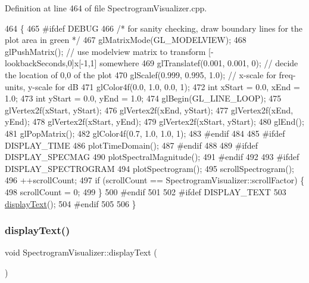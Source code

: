 Definition at line 464 of file Spectrogram\+Visualizer.\+cpp.


\begin{DoxyCode}
464                                     \{
465 \textcolor{preprocessor}{#ifdef DEBUG}
466     \textcolor{comment}{/* for sanity checking, draw boundary lines for the plot area in green */}
467     glMatrixMode(GL\_MODELVIEW);
468     glPushMatrix(); \textcolor{comment}{// use modelview matrix to transform [-lookbackSeconds,0]x[-1,1] somewhere}
469     glTranslatef(0.001, 0.001, 0);   \textcolor{comment}{// decide the location of 0,0 of the plot}
470     glScalef(0.999, 0.995, 1.0);  \textcolor{comment}{// x-scale for freq-units, y-scale for dB}
471     glColor4f(0.0, 1.0, 0.0, 1);
472     \textcolor{keywordtype}{int} xStart = 0.0, xEnd = 1.0;
473     \textcolor{keywordtype}{int} yStart = 0.0, yEnd = 1.0;
474     glBegin(GL\_LINE\_LOOP);
475         glVertex2f(xStart, yStart);
476         glVertex2f(xEnd, yStart);
477         glVertex2f(xEnd, yEnd);
478         glVertex2f(xStart, yEnd);
479         glVertex2f(xStart, yStart);
480     glEnd();
481     glPopMatrix();
482     glColor4f(0.7, 1.0, 1.0, 1);
483 \textcolor{preprocessor}{#endif}
484 
485 \textcolor{preprocessor}{#ifdef DISPLAY\_TIME}
486     plotTimeDomain();
487 \textcolor{preprocessor}{#endif}
488 
489 \textcolor{preprocessor}{#ifdef DISPLAY\_SPECMAG}
490     plotSpectralMagnitude();
491 \textcolor{preprocessor}{#endif}
492 
493 \textcolor{preprocessor}{#ifdef DISPLAY\_SPECTROGRAM}
494     plotSpectrogram();
495     scrollSpectrogram();
496     ++scrollCount;
497     \textcolor{keywordflow}{if} (scrollCount == SpectrogramVisualizer::scrollFactor) \{
498         scrollCount = 0;
499     \}
500 \textcolor{preprocessor}{#endif}
501 
502 \textcolor{preprocessor}{#ifdef DISPLAY\_TEXT}
503     \mbox{\hyperlink{structSpectrogramVisualizer_a9b9aa780d95f710b1c876ce49abac9a1}{displayText}}();
504 \textcolor{preprocessor}{#endif}
505 
506 \}
\end{DoxyCode}
\mbox{\label{structSpectrogramVisualizer_a9b9aa780d95f710b1c876ce49abac9a1}} 
\subsubsection{\texorpdfstring{display\+Text()}{displayText()}}
{\footnotesize\ttfamily void Spectrogram\+Visualizer\+::display\+Text (\begin{DoxyParamCaption}{ }\end{DoxyParamCaption})\hspace{0.3cm}{\ttfamily [virtual]}}


